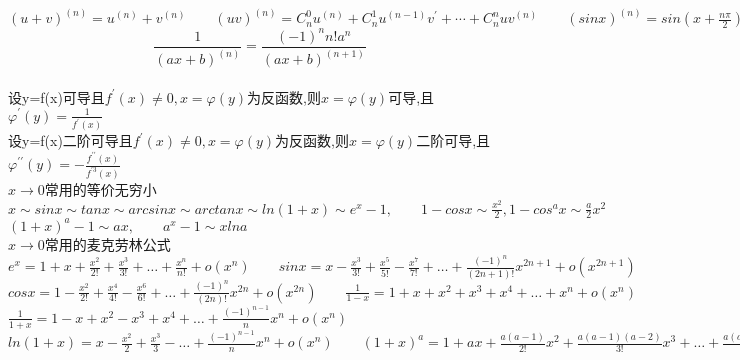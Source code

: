 \documentclass[a4paper,fleqn]{article}
\begin{document}
  \fontsize{9pt}{13.5pt}\selectfont
\(
	(u+v)^{(n)}=u^{(n)}+v^{(n)}
\qquad 
	(uv)^{(n)}=C_n^0u^{(n)}+C_n^1u^{(n-1)}v^\prime+ \cdots + C_n^nuv^{(n)}  
\qquad
	(sinx)^{(n)}=sin(x+\frac{n\pi}{2})  
\qquad
	(cosx)^{(n)}=coss(x+\frac{n\pi}{2})  
\)
\begin{displaymath} 
	\frac{1}{(ax+b)^{(n)}}= \frac{(-1)^nn!a^n}{(ax+b)^{(n+1)}} 
\end{displaymath} \\
设y=f(x)可导且\(f^\prime(x)\neq 0, x= \varphi(y)\)为反函数,则\(x=\varphi(y)\)可导,且
\(
\varphi^\prime(y)=\frac{1}{f^\prime(x)}
\) \\
设y=f(x)二阶可导且\(f^\prime(x)\neq 0, x= \varphi(y)\)为反函数,则\(x=\varphi(y)\)二阶可导,且
\(
\varphi^{\prime\prime}(y)=-\frac{f^{\prime\prime}(x)}{f^{\prime3}(x)}
\) \\
\(x \to 0 \)常用的等价无穷小 
\(
x \sim sinx \sim tanx \sim arcsinx \sim arctanx \sim ln(1+x) \sim e^x-1 ,\qquad 1-cosx \sim \frac{x^2}{2},1-cos^ax \sim \frac{a}{2} x^2
\)\\
\(
(1+x)^a-1 \sim ax ,\qquad 
a^x-1 \sim xlna
\) \\
\( x\to 0 \)常用的麦克劳林公式
\( 
e^x=1+x+\frac{x^2}{2!}+\frac{x^3}{3!}+\dots+\frac{x^n}{n!}+o(x^n) \qquad 
sinx=x-\frac{x^3}{3!}+\frac{x^5}{5!}-\frac{x^7}{7!}+\dots+\frac{(-1)^n}{(2n+1)!}x^{2n+1}+o(x^{2n+1})
\)\\
\(
cosx=1-\frac{x^2}{2!}+\frac{x^4}{4!}-\frac{x^6}{6!}+\dots+\frac{(-1)^n}{(2n)!}x^{2n}+o(x^{2n}) \qquad 
\frac{1}{1-x}=1+x+x^2+x^3+x^4+\dots+x^n+o(x^n) \)\\
\(
\frac{1}{1+x}=1-x+x^2-x^3+x^4+\dots+\frac{(-1)^{n-1}}{n}x^n+o(x^n)
\)\\
\(
ln(1+x)=x-\frac{x^2}{2}+\frac{x^3}{3}-\dots+\frac{(-1)^{n-1}}{n}x^n+o(x^n) \qquad
(1+x)^a=1+ax+\frac{a(a-1)}{2!}x^2+\frac{a(a-1)(a-2)}{3!}x^3+\dots+\frac{a(a-1)\dots(a+1-n)}{n!}x^n
\)
\end{document}
